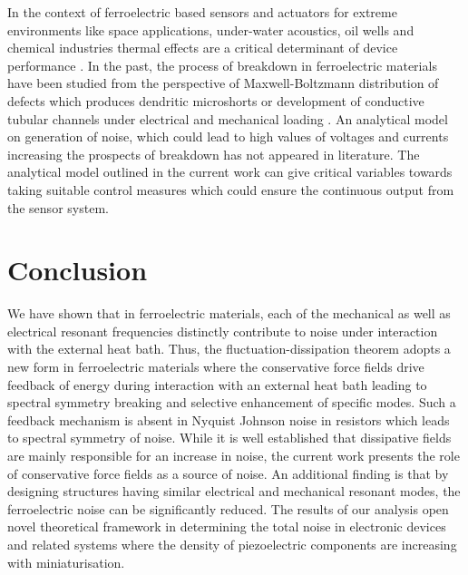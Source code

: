 \documentclass[12pt,column,showpacs,pre,preprintnumbers,amsmath,amssymb,aps,standalone]{revtex4-2}
\begin{document}
In the context of ferroelectric based sensors and actuators for extreme environments like space applications, under-water acoustics, oil wells and chemical industries thermal effects are a critical determinant of device performance \cite{38, 39}. In the past, the process of breakdown in ferroelectric materials have been studied from the perspective of Maxwell-Boltzmann distribution of defects which produces dendritic microshorts \cite{40} or development of conductive tubular channels under electrical and mechanical loading \cite{41}. An analytical model on generation of noise, which could lead to high values of voltages and currents increasing the prospects of breakdown has not appeared in literature. The analytical model outlined in the current work can give critical variables towards taking suitable control measures which could ensure the continuous output from the sensor system. 
  \section{Conclusion}
We have shown that in ferroelectric materials, each of the mechanical as well as electrical resonant frequencies distinctly contribute to noise under interaction with the external heat bath. Thus, the fluctuation-dissipation theorem adopts a new form in ferroelectric materials where the conservative force fields drive feedback of energy during interaction with an external heat bath leading to spectral symmetry breaking and selective enhancement of specific modes. Such a feedback mechanism is absent in Nyquist Johnson noise in resistors which leads to spectral symmetry of noise. While it is well established that dissipative fields are mainly responsible for an increase in noise, the current work presents the role of conservative force fields as a source of noise. An additional finding is that by designing structures having similar electrical and mechanical resonant modes, the ferroelectric noise can be significantly reduced. The results of our analysis  open novel theoretical framework in determining the total noise in electronic devices and related systems where the density of piezoelectric components are increasing with miniaturisation.
\end{document}
